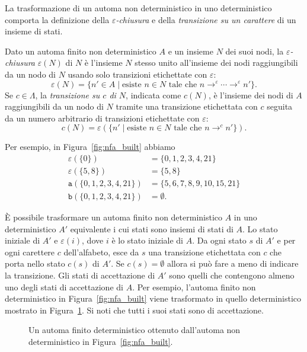 La trasformazione di un automa non deterministico in uno deterministico
comporta la definizione della \emph{$\varepsilon$-chiusura}
e della \emph{transizione su un carattere} di un insieme di stati.
%
\begin{definition}
  \label{def:closure}
Dato un automa finito non deterministico $A$ e un insieme $N$ dei suoi nodi,
la \emph{$\varepsilon$-chiusura} $\varepsilon(N)$ di $N$ \`e l'insieme $N$
stesso unito all'insieme dei nodi raggiungibili da un nodo di
$N$ usando solo transizioni etichettate con $\varepsilon$:
\[
  \varepsilon(N)=\{n'\in A\mid\text{esiste $n\in N$ tale che
                   $n\to^\varepsilon\cdots\to^\varepsilon n'$}\}.
\]
Se $c\in\Lambda$, la \emph{transizione su $c$ di $N$}, indicata come
$c(N)$, \`e l'insieme dei
nodi di $A$ raggiungibili da un nodo di $N$ tramite una transizione
etichettata con $c$ seguita da un numero arbitrario di transizioni
etichettate con $\varepsilon$:
\[
  c(N)=\varepsilon(\{n'\mid\text{esiste }n\in N\text{ tale che }
                   n\to^c n'\}).
\]
\end{definition}
%
\noindent
Per esempio, in Figura~\ref{fig:nfa_built} abbiamo
\begin{align*}
  \varepsilon(\{0\})&=\{0,1,2,3,4,21\}\\
  \varepsilon(\{5,8\})&=\{5,8\}\\
  \texttt{a}(\{0,1,2,3,4,21\})&=\{5,6,7,8,9,10,15,21\}\\
  \texttt{b}(\{0,1,2,3,4,21\})&=\emptyset.
\end{align*}

\`E possibile trasformare un automa finito non deterministico $A$ in uno
deterministico $A'$ equivalente i cui stati sono insiemi di stati di $A$.
Lo stato iniziale di $A'$ e $\varepsilon(i)$, dove $i$ \`e lo stato iniziale
di $A$. Da ogni stato $s$ di $A'$ e per ogni carettere $c$ dell'alfabeto,
esce da $s$ una transizione etichettata con $c$ che porta nello
stato $c(s)$ di $A'$. Se $c(s)=\emptyset$ allora si pu\`o fare a meno di
indicare la transizione. Gli stati di accettazione di $A'$ sono quelli che
contengono almeno uno degli stati di accettazione di $A$.
Per esempio, l'automa finito non deterministico in Figura~\ref{fig:nfa_built}
viene trasformato in quello deterministico mostrato in
Figura~\ref{fig:dfa_built}. Si noti che tutti i suoi stati sono di
accettazione.
%
\begin{figure}[t]
\begin{center}
\end{center}
\caption{Un automa finito deterministico ottenuto dall'automa non deterministico in Figura~\ref{fig:nfa_built}.}\label{fig:dfa_built}
\end{figure}

